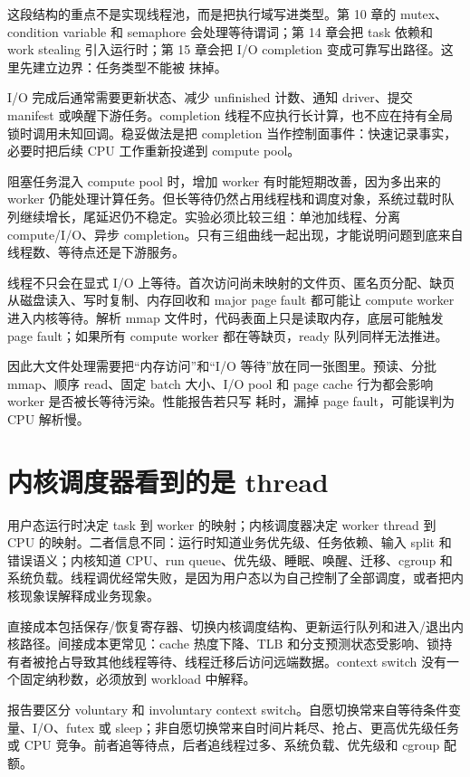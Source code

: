 这段结构的重点不是实现线程池，而是把执行域写进类型。第 10 章的 mutex、condition variable 和 semaphore 会处理等待谓词；第 14 章会把 task 依赖和 work stealing 引入运行时；第 15 章会把 I/O completion 变成可靠写出路径。这里先建立边界：任务类型不能被  抹掉。

I/O 完成后通常需要更新状态、减少 unfinished 计数、通知 driver、提交 manifest 或唤醒下游任务。completion 线程不应执行长计算，也不应在持有全局锁时调用未知回调。稳妥做法是把 completion 当作控制面事件：快速记录事实，必要时把后续 CPU 工作重新投递到 compute pool。

阻塞任务混入 compute pool 时，增加 worker 有时能短期改善，因为多出来的 worker 仍能处理计算任务。但长等待仍然占用线程栈和调度对象，系统过载时队列继续增长，尾延迟仍不稳定。实验必须比较三组：单池加线程、分离 compute/I/O、异步 completion。只有三组曲线一起出现，才能说明问题到底来自线程数、等待点还是下游服务。

线程不只会在显式 I/O 上等待。首次访问尚未映射的文件页、匿名页分配、缺页从磁盘读入、写时复制、内存回收和 major page fault 都可能让 compute worker 进入内核等待。解析 mmap 文件时，代码表面上只是读取内存，底层可能触发 page fault；如果所有 compute worker 都在等缺页，ready 队列同样无法推进。

因此大文件处理需要把“内存访问”和“I/O 等待”放在同一张图里。预读、分批 mmap、顺序 read、固定 batch 大小、I/O pool 和 page cache 行为都会影响 worker 是否被长等待污染。性能报告若只写  耗时，漏掉 page fault，可能误判为 CPU 解析慢。

\section{内核调度器看到的是 thread}

用户态运行时决定 task 到 worker 的映射；内核调度器决定 worker thread 到 CPU 的映射。二者信息不同：运行时知道业务优先级、任务依赖、输入 split 和错误语义；内核知道 CPU、run queue、优先级、睡眠、唤醒、迁移、cgroup 和系统负载。线程调优经常失败，是因为用户态以为自己控制了全部调度，或者把内核现象误解释成业务现象。

直接成本包括保存/恢复寄存器、切换内核调度结构、更新运行队列和进入/退出内核路径。间接成本更常见：cache 热度下降、TLB 和分支预测状态受影响、锁持有者被抢占导致其他线程等待、线程迁移后访问远端数据。context switch 没有一个固定纳秒数，必须放到 workload 中解释。

报告要区分 voluntary 和 involuntary context switch。自愿切换常来自等待条件变量、I/O、futex 或 sleep；非自愿切换常来自时间片耗尽、抢占、更高优先级任务或 CPU 竞争。前者追等待点，后者追线程过多、系统负载、优先级和 cgroup 配额。

